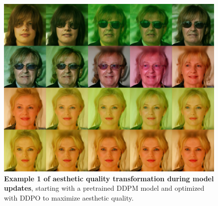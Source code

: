 \begin{appendixs}
        \begin{figure}
            \centering
            \includegraphics[scale=1.40]{img/results/laion_1.png}
            \vspace{-0pt}  %
            \captionsetup{width=\textwidth} %
            \caption{\textbf{Example 1 of aesthetic quality transformation during model updates}, starting with a pretrained DDPM model and optimized with DDPO to maximize aesthetic quality.}
            \label{fig:ddpm-to-ddpo-aesthetic-extra1}
        \end{figure}



\end{appendixs}

